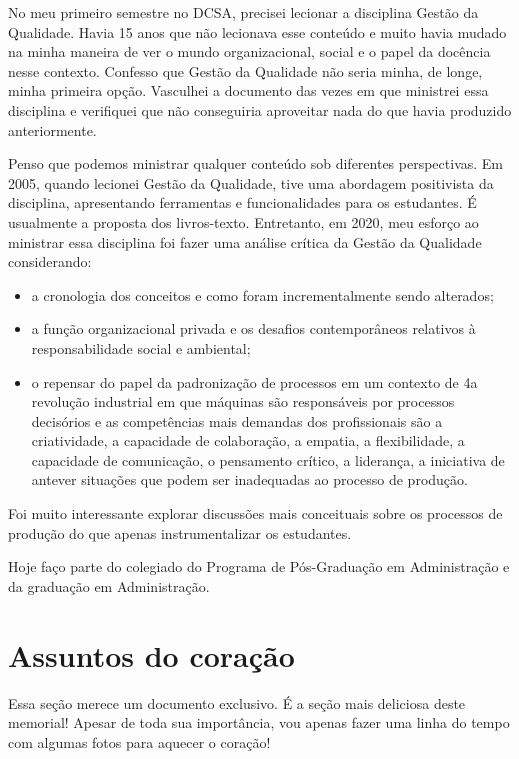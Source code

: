 \documentclass[
]{book}
\begin{document}
No meu primeiro semestre no DCSA, precisei lecionar a disciplina Gestão
da Qualidade. Havia 15 anos que não lecionava esse conteúdo e muito
havia mudado na minha maneira de ver o mundo organizacional, social e o
papel da docência nesse contexto. Confesso que Gestão da Qualidade não
seria minha, de longe, minha primeira opção. Vasculhei a documento das
vezes em que ministrei essa disciplina e verifiquei que não conseguiria
aproveitar nada do que havia produzido anteriormente.

Penso que podemos ministrar qualquer conteúdo sob diferentes
perspectivas. Em 2005, quando lecionei Gestão da Qualidade, tive uma
abordagem positivista da disciplina, apresentando ferramentas e
funcionalidades para os estudantes. É usualmente a proposta dos
livros-texto. Entretanto, em 2020, meu esforço ao ministrar essa
disciplina foi fazer uma análise crítica da Gestão da Qualidade
considerando:

\begin{itemize}
\item
  a cronologia dos conceitos e como foram incrementalmente sendo
  alterados;
\item
  a função organizacional privada e os desafios contemporâneos relativos
  à responsabilidade social e ambiental;
\item
  o repensar do papel da padronização de processos em um contexto de 4a
  revolução industrial em que máquinas são responsáveis por processos
  decisórios e as competências mais demandas dos profissionais são a
  criatividade, a capacidade de colaboração, a empatia, a flexibilidade,
  a capacidade de comunicação, o pensamento crítico, a liderança, a
  iniciativa de antever situações que podem ser inadequadas ao processo
  de produção.
\end{itemize}

Foi muito interessante explorar discussões mais conceituais sobre os
processos de produção do que apenas instrumentalizar os estudantes.

Hoje faço parte do colegiado do Programa de Pós-Graduação em
Administração e da graduação em Administração.

\hypertarget{assuntos-do-corauxe7uxe3o}{%
\chapter{Assuntos do coração}\label{assuntos-do-corauxe7uxe3o}}

Essa seção merece um documento exclusivo. É a seção mais deliciosa deste
memorial! Apesar de toda sua importância, vou apenas fazer uma linha do
tempo com algumas fotos para aquecer o coração!
\end{document}
